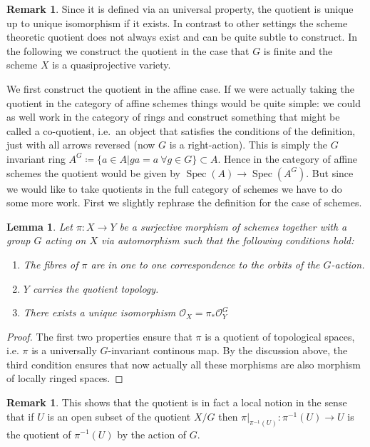 \documentclass[11pt, a4paper, german]{article}
\theoremstyle{plain}
\newtheorem{lemma}[theorem]{Lemma}
\theoremstyle{definition}
\newtheorem{remark}[theorem]{Remark}
\DeclareMathOperator{\Spec}{Spec}
\begin{document}
\begin{remark}
    Since it is defined via an universal property, the quotient is unique up to unique isomorphism if it exists. 
    In contrast to other settings the scheme theoretic quotient does not always exist and can be quite subtle to construct.
    In the following we construct the quotient in the case that $G$ is finite and the scheme $X$ is a quasiprojective variety.
\end{remark}

We first construct the quotient in the affine case. If we were actually taking the quotient in the category of affine schemes things would be
quite simple: we could as well work in the category of rings and construct something that might be called a co-quotient, i.e.\ an object that
satisfies the conditions of the definition, just with all arrows reversed (now $G$ is a right-action). This is simply the $G$ invariant ring
$A^G \coloneqq \{a \in A | ga = a \ \forall g \in G\} \subset A$. Hence in the category of affine schemes the quotient would be given by 
$\Spec(A) \to \Spec(A^G)$. But since we would like to take quotients in the full category of schemes we have to do some more work.
First we slightly rephrase the definition for the case of schemes.
\begin{lemma}
    \label{quotProps}
    Let $\pi \colon X \to Y$ be a surjective morphism of schemes together with a group $G$ acting on $X$ via automorphism 
    such that the following conditions hold:
    \begin{enumerate}[label=\rm{\roman*)}]
        \item The fibres of $\pi$ are in one to one correspondence to the orbits of the $G$-action.
        \item $Y$ carries the quotient topology.
        \item There exists a unique isomorphism $\mathcal{O}_X = \pi_*\mathcal{O}_Y^G$
    \end{enumerate}
\end{lemma}
\begin{proof}
    The first two properties ensure that $\pi$ is a quotient of topological spaces, i.e. $\pi$ is a universally $G$-invariant continous map.
    By the discussion above, the third condition ensures that now actually all these morphisms are also morphism of locally ringed spaces.
\end{proof}

\begin{remark}
    \label{quotLocal}
    This shows that the quotient is in fact a local notion in the sense that if $U$ is an open subset of the quotient $X/G$ 
    then $\pi|_{\pi^{-1}(U)} \colon \pi^{-1}(U) \to U$ is the quotient of $\pi^{-1}(U)$ by the action of $G$.
\end{remark}
\end{document}
